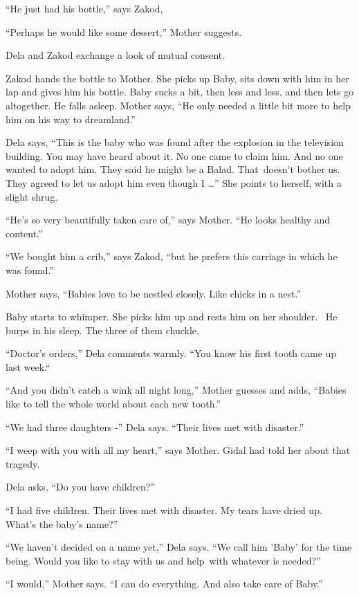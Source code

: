 \documentclass[twoside,11pt]{book}
\begin{document}
``He just had his bottle,'' says Zakod,

``Perhaps he would like some dessert,'' Mother suggests.

Dela and Zakod exchange a look of mutual consent.

Zakod hands the bottle to Mother. She picks up Baby, sits down with him in her lap and gives him his bottle. Baby sucks
a bit, then less and less, and then lets go altogether. He falls asleep. Mother says, ``He only needed a
little bit more to help him on his way to dreamland.''

Dela says, ``This is the baby who was found after the explosion in the television building. You may have
heard about it. No one came to claim him. And no one wanted to adopt him. They said he might be a Balad. That~doesn't
bother us. They agreed to let us adopt him even though I {\dots}'' She points to herself, with a slight
shrug.

``He's so very beautifully taken care of,'' says Mother. ``He looks healthy and
content.''

``We bought him a crib,'' says Zakod, ``but he prefers this carriage in which he
was found.''

Mother says, ``Babies love to be nestled closely. Like chicks in a nest.''

Baby starts to whimper. She picks him up and rests him on her shoulder. ~He burps in his sleep. The three of them
chuckle.

``Doctor's orders,'' Dela comments warmly. ``You know his first tooth came up
last week.``~

``And you didn't catch a wink all night long,'' Mother guesses and adds, ``Babies
like to tell the whole world about each new tooth.''

``We had three daughters -'' Dela says. ``Their lives met with
disaster.''

``I weep with you with all my heart,'' says Mother. Gidal had told her about that tragedy.

Dela asks, ``Do you have children?''

``I had five children. Their lives met with disaster. My tears have dried up. What's the baby's
name?''

``We haven't decided on a name yet,'' Dela says. ``We call him 'Baby' for the
time being. Would you like to stay with us and help~with whatever is needed?''

``I would,'' Mother says. ``I can do everything. And also take care of
Baby.''
\end{document}
